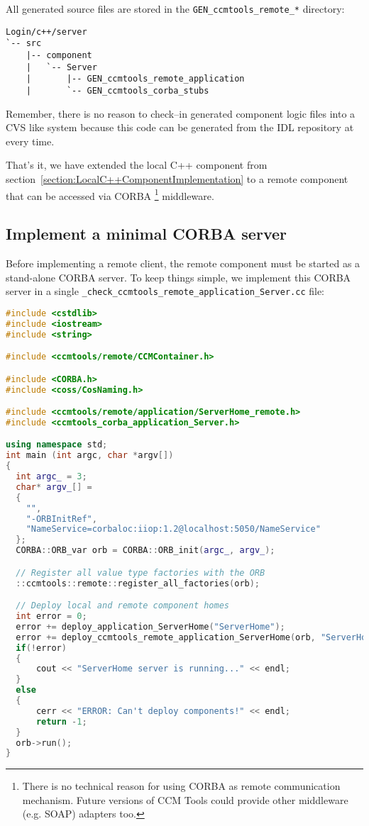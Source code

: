 All generated source files are stored in the {\tt GEN\_ccmtools\_remote\_*} directory:
\begin{footnotesize}
\begin{verbatim}
Login/c++/server
`-- src
    |-- component
    |   `-- Server
    |       |-- GEN_ccmtools_remote_application
    |       `-- GEN_ccmtools_corba_stubs
\end{verbatim}
\end{footnotesize}

Remember, there is no reason to check--in generated component logic files into a
CVS like system because this code can be generated from the IDL repository
at every time.

\vspace{3mm}
That's it, we have extended the local C++ component from 
section~\ref{section:LocalC++ComponentImplementation} to a remote component 
that can be accessed via CORBA
\footnote{
There is no technical reason for using CORBA as remote communication mechanism.
Future versions of CCM Tools could provide other middleware (e.g. SOAP)
adapters too. } 
middleware.

\subsection{Implement a minimal CORBA server}
\label{subsection:ImplementMinimalCorbaAserver}
Before implementing a remote client, the remote component must be started as a
stand-alone CORBA server.
To keep things simple, we implement this CORBA server in a single 
{\tt \_check\_ccmtools\_remote\_application\_Server.cc} file:
\begin{footnotesize}
\begin{lstlisting}[language=C++]
#include <cstdlib> 
#include <iostream>
#include <string>

#include <ccmtools/remote/CCMContainer.h>

#include <CORBA.h>
#include <coss/CosNaming.h>

#include <ccmtools/remote/application/ServerHome_remote.h>
#include <ccmtools_corba_application_Server.h>

using namespace std;
int main (int argc, char *argv[])
{
  int argc_ = 3;
  char* argv_[] = 
  { 
    "", 
    "-ORBInitRef", 
    "NameService=corbaloc:iiop:1.2@localhost:5050/NameService"
  }; 
  CORBA::ORB_var orb = CORBA::ORB_init(argc_, argv_);

  // Register all value type factories with the ORB  
  ::ccmtools::remote::register_all_factories(orb);

  // Deploy local and remote component homes	
  int error = 0;
  error += deploy_application_ServerHome("ServerHome");
  error += deploy_ccmtools_remote_application_ServerHome(orb, "ServerHome");
  if(!error) 
  {
      cout << "ServerHome server is running..." << endl;
  }
  else 
  {
      cerr << "ERROR: Can't deploy components!" << endl;
      return -1;
  }
  orb->run();
}
\end{lstlisting}
\end{footnotesize}

